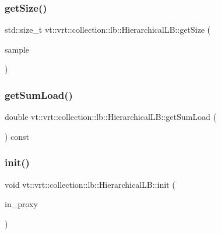 \subsubsection{\texorpdfstring{get\+Size()}{getSize()}}
{\footnotesize\ttfamily std\+::size\+\_\+t vt\+::vrt\+::collection\+::lb\+::\+Hierarchical\+L\+B\+::get\+Size (\begin{DoxyParamCaption}\item[{\hyperlink{structvt_1_1vrt_1_1collection_1_1lb_1_1_base_l_b_a331d7da5bbf2883238427d86b54ddd7b}{Obj\+Sample\+Type} const \&}]{sample }\end{DoxyParamCaption})\hspace{0.3cm}{\ttfamily [private]}}

\mbox{\label{structvt_1_1vrt_1_1collection_1_1lb_1_1_hierarchical_l_b_a4cdebd4215afd2cac890525c7901f4ad}} 
\subsubsection{\texorpdfstring{get\+Sum\+Load()}{getSumLoad()}}
{\footnotesize\ttfamily double vt\+::vrt\+::collection\+::lb\+::\+Hierarchical\+L\+B\+::get\+Sum\+Load (\begin{DoxyParamCaption}{ }\end{DoxyParamCaption}) const\hspace{0.3cm}{\ttfamily [private]}}

\mbox{\label{structvt_1_1vrt_1_1collection_1_1lb_1_1_hierarchical_l_b_a3200eb80dca7ad15c7f881dc418f22f7}} 
\subsubsection{\texorpdfstring{init()}{init()}}
{\footnotesize\ttfamily void vt\+::vrt\+::collection\+::lb\+::\+Hierarchical\+L\+B\+::init (\begin{DoxyParamCaption}\item[{\hyperlink{structvt_1_1objgroup_1_1proxy_1_1_proxy}{objgroup\+::proxy\+::\+Proxy}$<$ \hyperlink{structvt_1_1vrt_1_1collection_1_1lb_1_1_hierarchical_l_b}{Hierarchical\+LB} $>$}]{in\+\_\+proxy }\end{DoxyParamCaption})}

